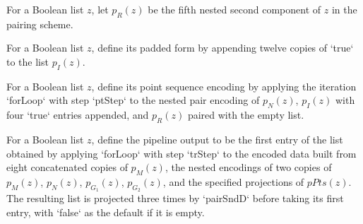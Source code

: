 \begin{definition}
\label{Randomized.PIT.pR}
\leanok
{}
For a Boolean list $z$, let $p_R(z)$ be the fifth nested second component of $z$ in the
pairing scheme.
\end{definition}

\begin{definition}
\label{Randomized.PIT.pM}
\leanok
{}
For a Boolean list $z$, define its padded form by appending twelve copies of `true` to
the list $p_I(z)$.
\end{definition}

\begin{definition}
\label{Randomized.PIT.pPts}
\leanok
{}
For a Boolean list $z$, define its point sequence encoding by applying the iteration
`forLoop` with step `ptStep` to the nested pair encoding of $p_N(z)$, $p_I(z)$ with four
`true` entries appended, and $p_R(z)$ paired with the empty list.
\end{definition}

\begin{definition}
\label{Randomized.PIT.pipe}
\leanok
{}
For a Boolean list $z$, define the pipeline output to be the first entry of the list
obtained by applying `forLoop` with step `trStep` to the encoded data built from eight
concatenated copies of $p_M(z)$, the nested encodings of two copies of $p_M(z)$,
$p_N(z)$, $p_{G_1}(z)$, $p_{G_2}(z)$, and the specified projections of $pPts(z)$. The
resulting list is projected three times by `pairSndD` before taking its first entry,
with `false` as the default if it is empty.
\end{definition}

